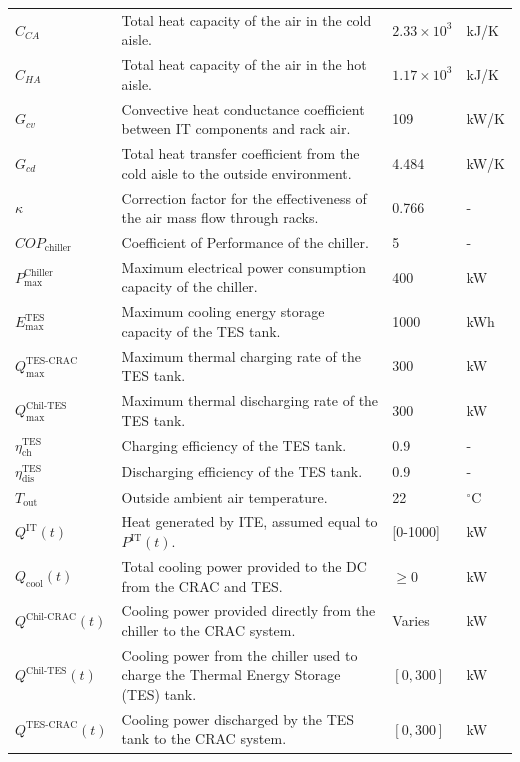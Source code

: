 \documentclass[lettersize,journal]{IEEEtran}
\begin{document}
{{\begin{longtable}{p{} p{} p{} p{}}
$C_{CA}$ & Total heat capacity of the air in the cold aisle. & $2.33 \times 10^3$ & kJ/K \\
$C_{HA}$ & Total heat capacity of the air in the hot aisle. & $1.17 \times 10^3$ & kJ/K \\
$G_{cv}$ & Convective heat conductance coefficient between IT components and rack air. & 109 &kW/K \\
$G_{cd}$ & Total heat transfer coefficient from the cold aisle to the outside environment. & 4.484 &kW/K \\
$\kappa$ & Correction factor for the effectiveness of the air mass flow through racks. & 0.766 & - \\
$COP_{\mathrm{chiller}}$ & Coefficient of Performance of the chiller. & 5 & - \\
$P^{\mathrm{Chiller}}_{\mathrm{max}}$ & Maximum electrical power consumption capacity of the chiller. & 400 &kW \\
$E^{\mathrm{TES}}_{\mathrm{max}}$ & Maximum cooling energy storage capacity of the TES tank. & 1000 &kWh \\
$Q^{\mathrm{TES}\text{-}\mathrm{CRAC}}_{\mathrm{max}}$ & Maximum thermal charging rate of the TES tank. & 300 &kW \\
$Q^{\mathrm{Chil}\text{-}\mathrm{TES}}_{\mathrm{max}}$ & Maximum thermal discharging rate of the TES tank. & 300 &kW \\
$\eta^{\mathrm{TES}}_{\mathrm{ch}}$ & Charging efficiency of the TES tank. & 0.9 & - \\
$\eta^{\mathrm{TES}}_{\mathrm{dis}}$ & Discharging efficiency of the TES tank. & 0.9 & - \\
$T_{\mathrm{out}}$ & Outside ambient air temperature. & 22 & $^{\circ}$C \\
$Q^{\mathrm{IT}}(t)$ & Heat generated by ITE, assumed equal to $P^{\mathrm{IT}}(t)$. & [0-1000] &kW \\
$Q_{\mathrm{cool}}(t)$ & Total cooling power provided to the DC from the CRAC and TES. & $\geq 0$ &kW \\
$Q^{\mathrm{Chil}\text{-}\mathrm{CRAC}}(t)$ & Cooling power provided directly from the chiller to the CRAC system. & Varies &kW \\
$Q^{\mathrm{Chil}\text{-}\mathrm{TES}}(t)$ & Cooling power from the chiller used to charge the Thermal Energy Storage (TES) tank. & $[0, 300]$ &kW \\
$Q^{\mathrm{TES}\text{-}\mathrm{CRAC}}(t)$ & Cooling power discharged by the TES tank to the CRAC system. & $[0, 300]$ &kW \\

\end{longtable}}}
\end{document}
